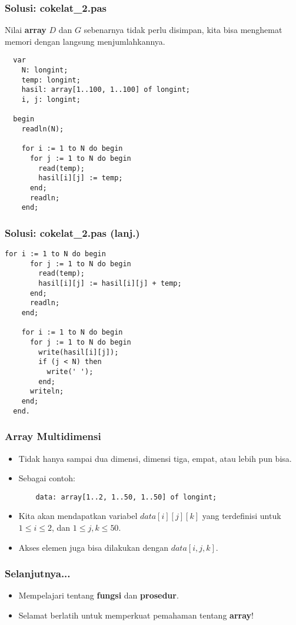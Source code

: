 \begin{frame}[fragile]
\frametitle{Solusi: cokelat\_2.pas}
Nilai \textbf{array} $D$ dan $G$ sebenarnya tidak perlu disimpan, kita bisa menghemat memori dengan langsung menjumlahkannya.
\begin{lstlisting}
  var
    N: longint;
    temp: longint;
    hasil: array[1..100, 1..100] of longint;
    i, j: longint;

  begin
    readln(N);

    for i := 1 to N do begin
      for j := 1 to N do begin
        read(temp);
        hasil[i][j] := temp;
      end;
      readln;
    end;
\end{lstlisting}
\end{frame}

\begin{frame}[fragile]
\frametitle{Solusi: cokelat\_2.pas (lanj.)}
\begin{lstlisting}[gobble=2]
    for i := 1 to N do begin
      for j := 1 to N do begin
        read(temp);
        hasil[i][j] := hasil[i][j] + temp;
      end;
      readln;
    end;

    for i := 1 to N do begin
      for j := 1 to N do begin
        write(hasil[i][j]);
        if (j < N) then
          write(' ');
        end;
      writeln;
    end;
  end.
\end{lstlisting}
\end{frame}

\begin{frame}[fragile]
\frametitle{Array Multidimensi}
\begin{itemize}
  \item Tidak hanya sampai dua dimensi, dimensi tiga, empat, atau lebih pun bisa.
  \item Sebagai contoh:
  \begin{lstlisting}
    data: array[1..2, 1..50, 1..50] of longint;
  \end{lstlisting}
  \item Kita akan mendapatkan variabel $data[i][j][k]$ yang terdefinisi untuk $1 \le i \le 2$, dan $1 \le j, k \le 50$.
  \item Akses elemen juga bisa dilakukan dengan $data[i,j,k]$.
\end{itemize}
\end{frame}

\begin{frame}
\frametitle{Selanjutnya...}
\begin{itemize}
  \item Mempelajari tentang \textbf{fungsi} dan \textbf{prosedur}.
  \item Selamat berlatih untuk memperkuat pemahaman tentang \textbf{array}!
\end{itemize}
\end{frame}


